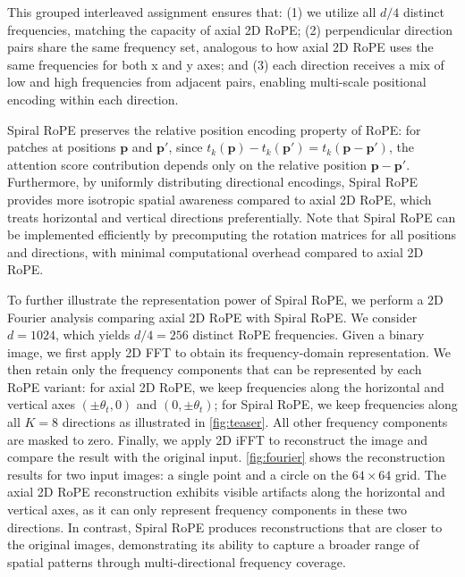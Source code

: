 This grouped interleaved assignment ensures that: (1) we utilize all $d/4$ distinct frequencies, matching the capacity of axial 2D RoPE; (2) perpendicular direction pairs share the same frequency set, analogous to how axial 2D RoPE uses the same frequencies for both x and y axes; and (3) each direction receives a mix of low and high frequencies from adjacent pairs, enabling multi-scale positional encoding within each direction.

Spiral RoPE preserves the relative position encoding property of RoPE: for patches at positions $\mathbf{p}$ and $\mathbf{p}'$, since $t_k(\mathbf{p}) - t_k(\mathbf{p}') = t_k(\mathbf{p} - \mathbf{p}')$, the attention score contribution depends only on the relative position $\mathbf{p} - \mathbf{p}'$. Furthermore, by uniformly distributing directional encodings, Spiral RoPE provides more isotropic spatial awareness compared to axial 2D RoPE, which treats horizontal and vertical directions preferentially. Note that Spiral RoPE can be implemented efficiently by precomputing the rotation matrices for all positions and directions, with minimal computational overhead compared to axial 2D RoPE.

To further illustrate the representation power of Spiral RoPE, we perform a 2D Fourier analysis comparing axial 2D RoPE with Spiral RoPE. We consider $d=1024$, which yields $d/4=256$ distinct RoPE frequencies. Given a binary image, we first apply 2D FFT to obtain its frequency-domain representation. We then retain only the frequency components that can be represented by each RoPE variant: for axial 2D RoPE, we keep frequencies along the horizontal and vertical axes $(\pm\theta_t, 0)$ and $(0, \pm\theta_t)$; for Spiral RoPE, we keep frequencies along all $K=8$ directions as illustrated in \cref{fig:teaser}. All other frequency components are masked to zero. Finally, we apply 2D iFFT to reconstruct the image and compare the result with the original input. \cref{fig:fourier} shows the reconstruction results for two input images: a single point and a circle on the $64 \times 64$ grid. The axial 2D RoPE reconstruction exhibits visible artifacts along the horizontal and vertical axes, as it can only represent frequency components in these two directions. In contrast, Spiral RoPE produces reconstructions that are closer to the original images, demonstrating its ability to capture a broader range of spatial patterns through multi-directional frequency coverage.

